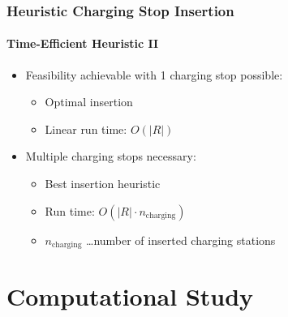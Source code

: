 \documentclass[aspectratio=1610]{beamer}
\newcommand{\important}[1]{{\color{green!60!black}#1}}
\let\oldfootnotesize\footnotesize
\renewcommand*{\footnotesize}{\oldfootnotesize\fontsize{6}{4}\selectfont}
\renewcommand{\footnotesize}{\scriptsize}
\begin{document}
\begin{frame}
  \frametitle{Heuristic Charging Stop Insertion}
  \framesubtitle{Time-Efficient Heuristic II}
  
\begin{itemize}
	\item Feasibility achievable with 1 charging stop possible:
	\smallskip
		\begin{itemize}
			\item Optimal insertion
			\smallskip
			\item Linear run time: $O(|R|)$
		\end{itemize}
	\bigskip
	\item Multiple charging stops necessary: 
	\smallskip
		\begin{itemize}
			\item Best insertion heuristic %
			\smallskip
			\item Run time: $O(|R| \cdot n_{\mathrm{charging}})$ 
			\smallskip
			\item $n_{\mathrm{charging}}$ \dots number of inserted charging stations 
		\end{itemize}
\end{itemize}

%

\end{frame}



\section{Computational Study}
\end{document}
